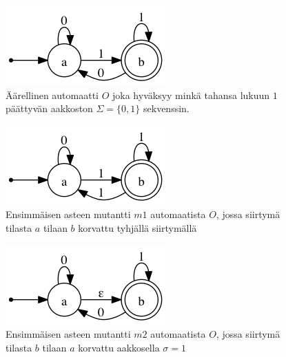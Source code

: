\documentclass{tktltiki}
\begin{document}
\begin{figure}[here]
\caption{Äärellinen automaatti $O$ joka hyväksyy minkä tahansa lukuun $1$ päättyvän aakkoston $\Sigma = \{0,1\}$ sekvenssin.}
\label{fig:nfa}
\includegraphics{automaatit/nfa.png}
\end{figure}

\begin{figure}[here]
\caption{Ensimmäisen asteen mutantti $m1$ automaatista $O$, jossa siirtymä tilasta $a$ tilaan $b$ korvattu tyhjällä siirtymällä}
\label{fig:m1}
\includegraphics{automaatit/m1.png}
\end{figure}

\begin{figure}[here]
\caption{Ensimmäisen asteen mutantti $m2$ automaatista $O$, jossa siirtymä tilasta $b$ tilaan $a$ korvattu aakkosella $\sigma = 1$}
\label{fig:m2}
\includegraphics{automaatit/m2.png}
\end{figure}
\end{document}
